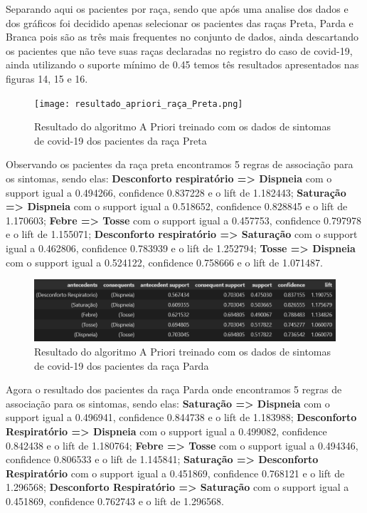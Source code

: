\documentclass[tcc1]{uftex}
\begin{document}
\begin{itemize}
    Separando aqui os pacientes por raça, sendo que após uma analise dos dados e dos gráficos foi decidido apenas selecionar os pacientes das raças Preta, Parda e Branca pois são as três mais frequentes no conjunto de dados, ainda descartando os pacientes que não teve suas raças declaradas no registro do caso de covid-19, ainda utilizando o suporte mínimo de 0.45 temos tês resultados apresentados nas figuras 14, 15 e 16.  
    

    \begin{figure}[!h]
    \centering
    \texttt{[image: resultado\_apriori\_raça\_Preta.png]} %
    \caption{Resultado do algoritmo A Priori treinado com os dados de sintomas de covid-19 dos pacientes da raça Preta}
    \end{figure}
    
    Observando os pacientes da raça preta encontramos 5 regras de associação para os sintomas, sendo elas: 
    \textbf{Desconforto respiratório => Dispneia} com o support igual a 0.494266, confidence 0.837228 e o lift de 1.182443;
    \textbf{Saturação => Dispneia} com o support igual a 0.518652, confidence 0.828845 e o lift de 1.170603; 
    \textbf{Febre => Tosse} com o support igual a 0.457753, confidence 0.797978 e o lift de 1.155071;
    \textbf{Desconforto respiratório => Saturação} com o support igual a 0.462806, confidence 0.783939 e o lift de 1.252794;
    \textbf{Tosse => Dispneia} com o support igual a 0.524122, confidence 0.758666 e o lift de 1.071487.
    
    \begin{figure}[!h]
    \centering
    \includegraphics[width=15cm]{resultado_apriori_03(sexoMasculino).png} %
    \caption{Resultado do algoritmo A Priori treinado com os dados de sintomas de covid-19 dos pacientes da raça Parda}
    \end{figure}
    
    Agora o resultado dos pacientes da raça Parda onde encontramos 5 regras de associação para os sintomas, sendo elas: 
    \textbf{Saturação => Dispneia} com o support igual a 0.496941, confidence 0.844738 e o lift de 1.183988;
    \textbf{Desconforto Respiratório => Dispneia} com o support igual a 0.499082, confidence 0.842438 e o lift de 1.180764; 
    \textbf{Febre => Tosse} com o support igual a 0.494346, confidence 0.806533 e o lift de 1.145841;
    \textbf{Saturação => Desconforto Respiratório} com o support igual a 0.451869, confidence 0.768121 e o lift de 1.296568;
    \textbf{Desconforto Respiratório => Saturação} com o support igual a 0.451869, confidence 0.762743 e o lift de 1.296568.
    

\end{itemize}
\end{document}
